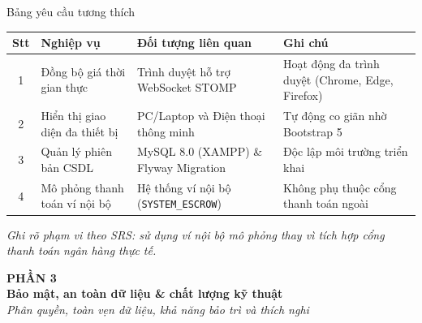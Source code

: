 \documentclass[aspectratio=169, 10pt]{beamer}
\begin{document}
\begin{frame}{Bảng yêu cầu tương thích}
    \footnotesize
    \begin{table}[h]
        \centering
        \begin{tabular}{c p{3.4cm} p{4.2cm} p{3.8cm}}
            \toprule
            \textbf{Stt} & \textbf{Nghiệp vụ} & \textbf{Đối tượng liên quan} & \textbf{Ghi chú} \\
            \midrule
            1 & Đồng bộ giá thời gian thực & Trình duyệt hỗ trợ WebSocket STOMP & Hoạt động đa trình duyệt (Chrome, Edge, Firefox) \\
            \midrule
            2 & Hiển thị giao diện đa thiết bị & PC/Laptop và Điện thoại thông minh & Tự động co giãn nhờ Bootstrap 5 \\
            \midrule
            3 & Quản lý phiên bản CSDL & MySQL 8.0 (XAMPP) \& Flyway Migration & Độc lập môi trường triển khai \\
            \midrule
            4 & Mô phỏng thanh toán ví nội bộ & Hệ thống ví nội bộ (\texttt{SYSTEM\_ESCROW}) & Không phụ thuộc cổng thanh toán ngoài \\
            \bottomrule
        \end{tabular}
    \end{table}
    \vspace{0.15cm}
    \centering \textit{\footnotesize Ghi rõ phạm vi theo SRS: sử dụng ví nội bộ mô phỏng thay vì tích hợp cổng thanh toán ngân hàng thực tế.}
\end{frame}

\begin{frame}
    \begin{center}
        \vspace{1.5cm}
        {\Large \textbf{\color{primaryNavy}PHẦN 3}}\\[0.5cm]
        {\huge \textbf{\color{primaryNavy}Bảo mật, an toàn dữ liệu \& chất lượng kỹ thuật}}\\[0.6cm]
        \textit{\color{secondarySlate}Phân quyền, toàn vẹn dữ liệu, khả năng bảo trì và thích nghi}
    \end{center}
\end{frame}
\end{document}
